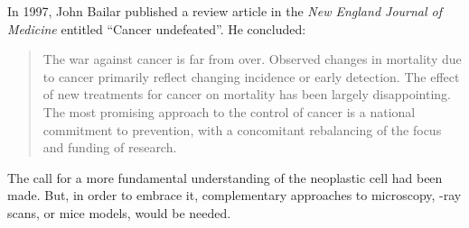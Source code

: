
\medskip

In 1997, John Bailar published a review article in the \emph{New England Journal
  of Medicine} entitled ``Cancer undefeated''.\cite{bailar_cancer_1997} He
concluded:

\begin{quotation}
  The war against cancer is far from over.  Observed changes in mortality due to
  cancer primarily reflect changing incidence or early detection.  The effect of
  new treatments for cancer on mortality has been largely disappointing.  The
  most promising approach to the control of cancer is a national commitment to
  prevention, with a concomitant rebalancing of the focus and funding of
  research.
\end{quotation}

The call for a more fundamental understanding of the neoplastic cell had been
made.  But, in order to embrace it, complementary approaches to microscopy,
-ray scans, or mice models, would be needed.

\clearpage







